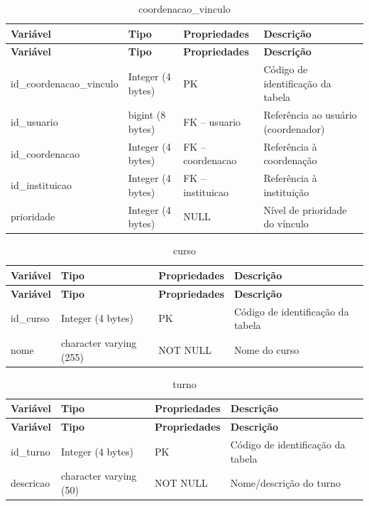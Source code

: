 \fonteautores

\vspace{\baselineskip}

\Needspace{0.32\textheight}
\begin{longtable}{|L{5.2cm}|L{3.2cm}|L{2.4cm}|L{3.4cm}|}
\caption{coordenacao\_vinculo} \\
\hline
\textbf{Variável} & \textbf{Tipo} & \textbf{Propriedades} & \textbf{Descrição} \\
\hline
\endfirsthead
\hline
\textbf{Variável} & \textbf{Tipo} & \textbf{Propriedades} & \textbf{Descrição} \\
\hline
\endhead
id\_coordenacao\_vinculo & Integer (4 bytes) & PK & Código de identificação da tabela \\
\hline
id\_usuario & bigint (8 bytes) & FK – usuario & Referência ao usuário (coordenador) \\
\hline
id\_coordenacao & Integer (4 bytes) & FK – coordenacao & Referência à coordenação \\
\hline
id\_instituicao & Integer (4 bytes) & FK – instituicao & Referência à instituição \\
\hline
prioridade & Integer (4 bytes) & NULL & Nível de prioridade do vínculo \\
\hline
\end{longtable}

\fonteautores

\vspace{\baselineskip}

\Needspace{0.32\textheight}
\begin{longtable}{|L{5.2cm}|L{3.2cm}|L{2.4cm}|L{3.4cm}|}
\caption{curso} \\
\hline
\textbf{Variável} & \textbf{Tipo} & \textbf{Propriedades} & \textbf{Descrição} \\
\hline
\endfirsthead
\hline
\textbf{Variável} & \textbf{Tipo} & \textbf{Propriedades} & \textbf{Descrição} \\
\hline
\endhead
id\_curso & Integer (4 bytes) & PK & Código de identificação da tabela \\
\hline
nome & character varying (255) & NOT NULL & Nome do curso \\
\hline
\end{longtable}

\fonteautores

\vspace{\baselineskip}

\Needspace{0.32\textheight}
\begin{longtable}{|L{5.2cm}|L{3.2cm}|L{2.4cm}|L{3.4cm}|}
\caption{turno} \\
\hline
\textbf{Variável} & \textbf{Tipo} & \textbf{Propriedades} & \textbf{Descrição} \\
\hline
\endfirsthead
\hline
\textbf{Variável} & \textbf{Tipo} & \textbf{Propriedades} & \textbf{Descrição} \\
\hline
\endhead
id\_turno & Integer (4 bytes) & PK & Código de identificação da tabela \\
\hline
descricao & character varying (50) & NOT NULL & Nome/descrição do turno \\
\hline
\end{longtable}

